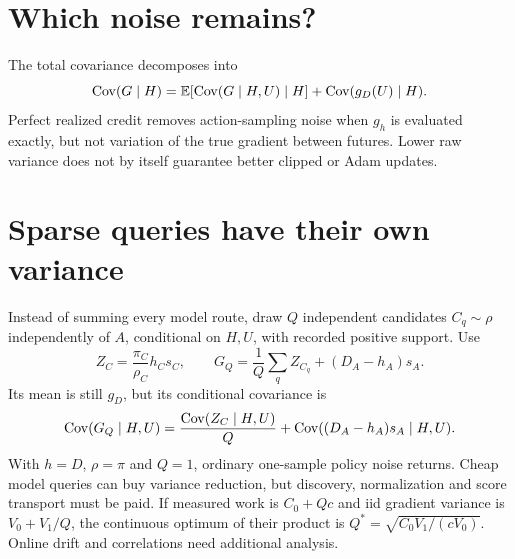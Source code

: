 \documentclass[11pt]{article}
\begin{document}
\section{Which noise remains?}
The total covariance decomposes into
\[
 \operatorname{Cov}(G\mid H)=\mathbb{E}[\operatorname{Cov}(G\mid H,U)\mid H]
                +\operatorname{Cov}(g_D(U)\mid H).
\]
Perfect realized credit removes action-sampling noise when $g_h$ is evaluated exactly, but not variation of the true gradient between futures. Lower raw variance does not by itself guarantee better clipped or Adam updates.
\section{Sparse queries have their own variance}
Instead of summing every model route, draw $Q$ independent candidates $C_q\sim\rho$ independently of $A$, conditional on $H,U$, with recorded positive support. Use
\[
 Z_C=\frac{\pi_C}{\rho_C}h_Cs_C,\qquad
 G_Q=\frac1Q\sum_q Z_{C_q}+(D_A-h_A)s_A.
\]
Its mean is still $g_D$, but its conditional covariance is
\[
 \operatorname{Cov}(G_Q\mid H,U)=\frac{\operatorname{Cov}(Z_C\mid H,U)}Q
                         +\operatorname{Cov}((D_A-h_A)s_A\mid H,U).
\]
With $h=D$, $\rho=\pi$ and $Q=1$, ordinary one-sample policy noise returns. Cheap model queries can buy variance reduction, but discovery, normalization and score transport must be paid. If measured work is $C_0+Qc$ and iid gradient variance is $V_0+V_1/Q$, the continuous optimum of their product is $Q^*=\sqrt{C_0V_1/(cV_0)}$. Online drift and correlations need additional analysis.
\end{document}
